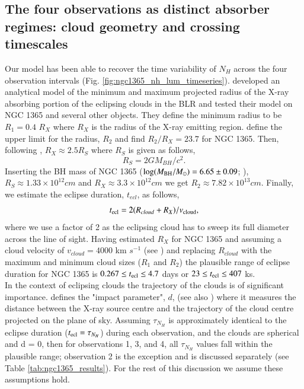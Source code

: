 \documentclass{aa}
\begin{document}
\subsection{The four observations as distinct absorber regimes: cloud geometry and crossing timescales}
\label{sec:discuss_hmc_diagnostic}
Our model has been able to recover the time variability of $N_H$ across the four observation intervals (Fig. \ref{fig:ngc1365_nh_lum_timeseries}). \citet{Pietrini2019} developed an analytical model of the minimum and maximum projected radius of the X-ray absorbing portion of the eclipsing clouds in the BLR and tested their model on NGC 1365 and several other objects. They define the minimum radius to be $R_1 = 0.4$ $R_X$ where $R_X$ is the radius of the X-ray emitting region. \citet{Pietrini2019} define the upper limit for the radius, $R_2$ and \citet{Pietrini2024} find $R_2/R_X=23.7$ for NGC 1365. Then, following \citet{Torricelli2014}, $R_X \approx 2.5 R_S$ where $R_S$ is given as follows, 
\begin{equation}
\label{eq:schild_radius}
R_S = 2GM_{BH}/c^2.
\end{equation}
Inserting the BH mass of NGC 1365 ($\log(M_{\rm BH}/M_\odot) = 6.65 \pm 0.09$; \citealt{Ricci2017}), $R_S \approx 1.33 \times 10^{12} cm$ and $R_X \approx 3.3 \times 10^{12} cm$ we get $R_2 \approx 7.82 \times 10^{13} cm$. Finally, we estimate the eclipse duration, $t_{ecl}$, as follows, 
\begin{equation}
\label{eq:eclipse_duration}
t_{\rm ecl} = 2(R_{cloud} + R_X)/v_{\rm cloud},
\end{equation}
where we use a factor of 2 as the eclipsing cloud has to sweep its full diameter across the line of sight. Having estimated $R_X$ for NGC 1365 and assuming a cloud velocity of $v_{cloud} = 4000$ km $s^{-1}$ (see \citealt{Torricelli2014}) and replacing $R_{cloud}$ with the maximum and minimum cloud sizes ($R_1$ and $R_2$) the plausible range of eclipse duration for NGC 1365 is $ 0.267 \le t_{\rm ecl} \le 4.7$ days or $ 23 \le t_{\rm ecl} \le 407$ ks. \\
In the context of eclipsing clouds the trajectory of the clouds is of significant importance. \citet{Pietrini2024} defines the "impact parameter", $d$, (see also \citealt{Torricelli2014}) where it measures the distance between the X-ray source centre and the trajectory of the cloud centre projected on the plane of sky. Assuming $\tau_{N_H}$ is approximately identical to the eclipse duration ($t_{\rm ecl} = \tau_{N_H}$) during each observation, and the clouds are spherical and d = 0, then for observations 1, 3, and 4, all $\tau_{N_H}$ values fall within the plausible range; observation 2 is the exception and is discussed separately (see Table \ref{tab:ngc1365_results}). For the rest of this discussion we assume these assumptions hold. \\
\end{document}
